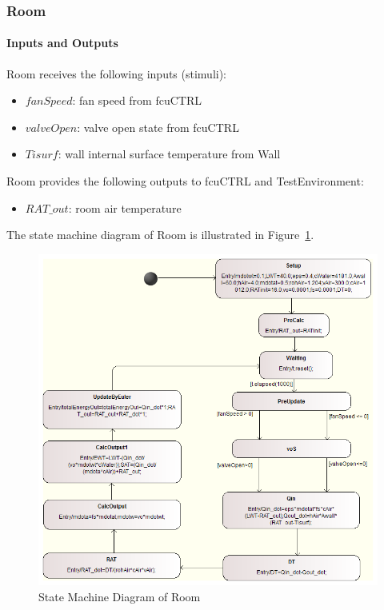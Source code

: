 \subsubsection{Room}
\paragraph{Inputs and Outputs}
Room receives the following inputs (stimuli):
\begin{itemize}
    \item $fanSpeed$: fan speed from fcuCTRL
    \item $valveOpen$: valve open state from fcuCTRL
	\item $Tisurf$: wall internal surface temperature from Wall
\end{itemize}

Room provides the following outputs to fcuCTRL and TestEnvironment:
\begin{itemize}
    \item $RAT\_out$: room air temperature
\end{itemize}

The state machine diagram of Room is illustrated in Figure~\ref{fig:fcu_sut_room_sm}.
\begin{figure}[htb!]
    \centering
	\includegraphics[width=1.0\textwidth]{roomwall/fcu_sut_room_sm}
    \caption{State Machine Diagram of Room}
    \label{fig:fcu_sut_room_sm}
\end{figure}

